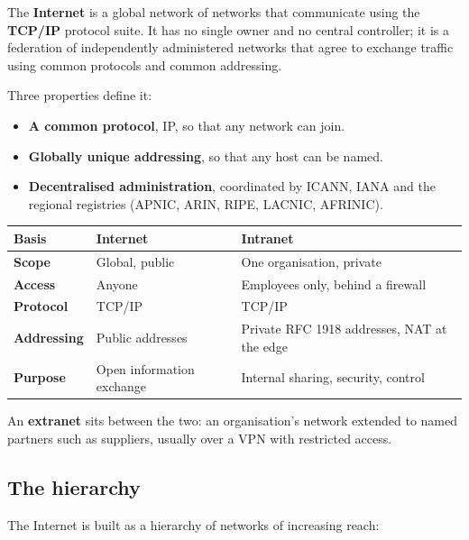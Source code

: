 \documentclass[11pt,a4paper]{article}
\begin{document}
\begin{solbox}
The \textbf{Internet} is a global network of networks that communicate using the \textbf{TCP/IP} protocol suite. It has no single owner and no central controller; it is a federation of independently administered networks that agree to exchange traffic using common protocols and common addressing.

Three properties define it:
\begin{itemize}
\item \textbf{A common protocol}, IP, so that any network can join.
\item \textbf{Globally unique addressing}, so that any host can be named.
\item \textbf{Decentralised administration}, coordinated by ICANN, IANA and the regional registries (APNIC, ARIN, RIPE, LACNIC, AFRINIC).
\end{itemize}

\begin{center}\small
\begin{tabularx}{\textwidth}{>{\bfseries}p{} X X}
\toprule Basis & Internet & Intranet\\
\midrule
Scope & Global, public & One organisation, private\\
Access & Anyone & Employees only, behind a firewall\\
Protocol & TCP/IP & TCP/IP\\
Addressing & Public addresses & Private RFC 1918 addresses, NAT at the edge\\
Purpose & Open information exchange & Internal sharing, security, control\\
\bottomrule
\end{tabularx}
\end{center}

An \textbf{extranet} sits between the two: an organisation's network extended to named partners such as suppliers, usually over a VPN with restricted access.

\subsection{The hierarchy}

The Internet is built as a hierarchy of networks of increasing reach:


\end{solbox}
\end{document}
